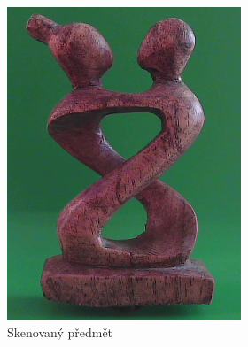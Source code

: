 \documentclass[12pt]{report}			%
\begin{document}
    	       \begin{figure}[h]
                    \centering
                    \begin{subfigure}[b]{0.3\textwidth}
                        \centering
                        \includegraphics[width=\textwidth]{images/sochaOriginal.png}
                        \caption{Skenovaný předmět}
                    \end{subfigure}
                    \hfill
                    \begin{subfigure}[b]{0.3\textwidth}
                        \centering

\end{subfigure}
\end{figure}
\end{document}
